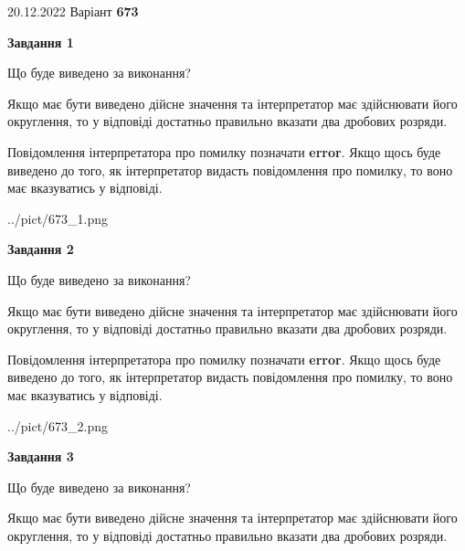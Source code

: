 \documentclass[12pt, ukrainian]{article}
\begin{document}
{20.12.2022 Варіант \No \textbf { 673 }\par}
{
\begin {Large}

{\begin {center}\textbf{Завдання 1}\end {center}}\par
Що буде виведено за виконання? \par

Якщо має бути виведено дійсне значення та інтерпретатор має здійснювати його округлення, 
то у відповіді достатньо правильно вказати два дробових розряди.

Повідомлення інтерпретатора про помилку позначати \textbf{error}.
Якщо щось буде виведено до того, як інтерпретатор видасть повідомлення про помилку, 
то воно має вказуватись у відповіді. \par

\begin{center}
	{../pict/673_1.png}
\end{center}
\newpage

{\begin {center}\textbf{Завдання 2}\end {center}}\par
Що буде виведено за виконання? \par

Якщо має бути виведено дійсне значення та інтерпретатор має здійснювати його округлення, 
то у відповіді достатньо правильно вказати два дробових розряди.

Повідомлення інтерпретатора про помилку позначати \textbf{error}.
Якщо щось буде виведено до того, як інтерпретатор видасть повідомлення про помилку, 
то воно має вказуватись у відповіді. \par

\begin{center}
	{../pict/673_2.png}
\end{center}
\newpage

{\begin {center}\textbf{Завдання 3}\end {center}}\par
Що буде виведено за виконання? \par

Якщо має бути виведено дійсне значення та інтерпретатор має здійснювати його округлення, 
то у відповіді достатньо правильно вказати два дробових розряди.


\end{Large}}
\end{document}
